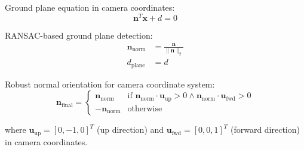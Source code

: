 \documentclass{article}
\begin{document}
Ground plane equation in camera coordinates:
$$
\boldsymbol{n}^T \boldsymbol{x} + d = 0
$$

RANSAC-based ground plane detection:
$$
\begin{aligned}
\boldsymbol{n}_{\text{norm}} &= \frac{\boldsymbol{n}}{\|\boldsymbol{n}\|_2} \\
d_{\text{plane}} &= d
\end{aligned}
$$

Robust normal orientation for camera coordinate system:
$$
\boldsymbol{n}_{\text{final}} = \begin{cases}
\boldsymbol{n}_{\text{norm}} & \text{if } \boldsymbol{n}_{\text{norm}} \cdot \boldsymbol{u}_{\text{up}} > 0 \land \boldsymbol{n}_{\text{norm}} \cdot \boldsymbol{u}_{\text{fwd}} > 0 \\
-\boldsymbol{n}_{\text{norm}} & \text{otherwise}
\end{cases}
$$

where $\boldsymbol{u}_{\text{up}} = [0, -1, 0]^T$ (up direction) and $\boldsymbol{u}_{\text{fwd}} = [0, 0, 1]^T$ (forward direction) in camera coordinates.
\end{document}
